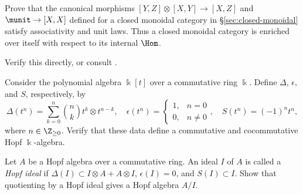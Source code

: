
\hypertarget{o014.aljabr2.chapter7.exercises-b}{ }
	\item Prove that the canonical morphisms
	$[Y,Z]\otimes[X,Y]\to[X,Z]$ and $\munit\to[X,X]$ defined for a closed
	monoidal category in \S\ref{sec:closed-monoidal} satisfy associativity and
	unit laws. Thus a closed monoidal category is enriched over itself with
	respect to its internal $\Hom$.
	\begin{hint}
		Verify this directly, or consult \cite[Section 1.6]{Kel05}.
	\end{hint}

	\item Consider the polynomial algebra $\Bbbk[t]$ over a commutative ring
	$\Bbbk$. Define $\Delta$, $\epsilon$, and $S$, respectively, by
	\[ \Delta(t^n) = \sum_{k=0}^n \binom{n}{k} t^k \otimes t^{n-k}, \quad \epsilon(t^n) = \begin{cases}
		1, & n = 0 \\
		0, & n \neq 0
	\end{cases}, \quad
	S(t^n) = (-1)^n t^n, \]
	where $n\in\Z_{\geq0}$. Verify that these data define a commutative and
	cocommutative Hopf $\Bbbk$-algebra.

	\item Let $A$ be a Hopf algebra over a commutative ring. An ideal $I$ of
	$A$ is called a \emph{Hopf ideal} if
	$\Delta(I)\subset I\otimes A+A\otimes I$, $\epsilon(I)=0$, and
	$S(I)\subset I$. Show that quotienting by a Hopf ideal gives a Hopf
	algebra $A/I$.

